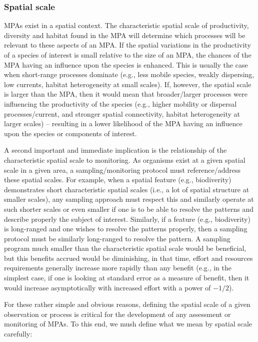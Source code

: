\documentclass[letterpaper,portrait,11pt]{scrartcl}
\numberwithin{equation}{section}		%
\numberwithin{figure}{section}		%
\numberwithin{table}{section}				%
\begin{document}
\subsubsection{Spatial scale}
\label{sec:interpolationSpatial}

MPAs exist in a spatial context. The characteristic spatial scale of productivity, diversity and habitat found in the MPA will determine which processes will be relevant to these aspects of an MPA. If the spatial variations in the productivity of a species of interest is small relative to the size of an MPA, the chances of the MPA having an influence upon the species is enhanced. This is usually the case when short-range processes dominate (e.g., less mobile species, weakly dispersing, low currents, habitat heterogeneity at small scales). If, however, the spatial scale is larger than the MPA, then it would mean that broader/larger processes were influencing the productivity of the species (e.g., higher mobility or dispersal processes/current, and stronger spatial connectivity, habitat heterogeneity at larger scales) -- resulting in a lower likelihood of the MPA having an influence upon the species or components of interest. 

A second important and immediate implication is the relationship of the characteristic spatial scale to monitoring. As organisms exist at a given spatial scale in a given area, a sampling/monitoring protocol must reference/address these spatial scales. For example, when a spatial feature (e.g., biodiverity) demonstrates short characteristic spatial scales (i.e., a lot of spatial structure at smaller scales), any sampling approach must respect this and similarly operate at such shorter scales or even smaller if one is to be able to resolve the patterns and describe properly the subject of interest. Similarly, if a feature (e.g., biodiverity) is long-ranged and one wishes to resolve the patterns properly, then a sampling protocol must be similarly long-ranged to resolve the pattern. A sampling program much smaller than the characteristic spatial scale would be beneficial, but this benefits accrued would be diminishing, in that time, effort and resources requirements generally increase more rapidly than any benefit (e.g., in the simplest case, if one is looking at standard error as a measure of benefit, then it would increase asymptotically with increased effort with a power of $-1/2$). 

For these rather simple and obvious reasons, defining the spatial scale of a given observation or process is critical for the development of any assessment or monitoring of MPAs. To this end, we mush define what we mean by spatial scale carefully:
\end{document}
